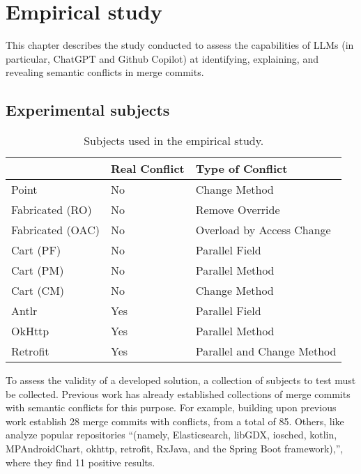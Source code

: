 \chapter{Empirical study}\label{chap:study}

This chapter describes the study conducted to assess the capabilities of LLMs
(in particular, ChatGPT and Github Copilot) at identifying, explaining,
and revealing semantic conflicts in merge commits.

\section{Experimental subjects}\label{chap:study:subjects}

\begin{table}[t]
\centering
\begin{tabular}{@{\extracolsep{\fill}} lll} \toprule
                 & Real Conflict & Type of Conflict \\
\midrule
Point            & No  & Change Method \\
Fabricated (RO)  & No  & Remove Override \\
Fabricated (OAC) & No  & Overload by Access Change \\
Cart (PF)        & No  & Parallel Field \\
Cart (PM)        & No  & Parallel Method \\
Cart (CM)        & No  & Change Method \\
Antlr            & Yes & Parallel Field \\
OkHttp           & Yes & Parallel Method \\
Retrofit         & Yes & Parallel and Change Method \\
\bottomrule
\end{tabular}
\caption{Subjects used in the empirical study.\label{tab:subjects}}
\end{table}

To assess the validity of a developed solution, a collection of subjects to test must be collected. 
Previous work has already established collections of merge commits with semantic conflicts for this purpose. For example, building upon previous work \citet{kn:leuson2} establish 28 merge commits with conflicts, from a total of 85.
Others, like \citet{kn:safemerge} analyze popular repositories ``(namely, Elasticsearch, libGDX, iosched, kotlin, MPAndroidChart, okhttp, retrofit, RxJava, and the Spring Boot framework),'', where they find 11 positive results.

